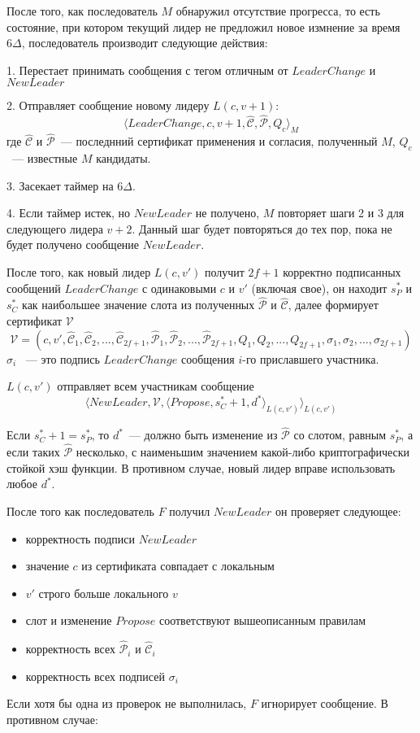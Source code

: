 После того, как последователь $M$ обнаружил отсутствие прогресса, то есть состояние, при котором текущий лидер не предложил новое измнение за время $6\Delta$, последователь производит следующие действия:

1. Перестает принимать сообщения с тегом отличным от $LeaderChange$ и $NewLeader$

2. Отправляет сообщение новому лидеру $L(c, v+1)$:
\[ \langle LeaderChange, c, v+1,  \hat{\mathcal{C}}, \hat{\mathcal{P}}, Q_c \rangle_M \]
где $\hat{\mathcal{C}}$ и $\hat{\mathcal{P}}$~--- последнний сертификат применения и согласия, полученный $M$, $Q_c$~--- известные $M$ кандидаты.

3. Засекает таймер на $6\Delta$.

4. Если таймер истек, но $NewLeader$ не получено, $M$ повторяет шаги 2 и 3 для следующего лидера $v+2$. Данный шаг будет повторяться до тех пор, пока не будет получено сообщение $NewLeader$.
\vspace{10pt}

После того, как новый лидер $L(c, v')$ получит $2f+1$ корректно подписанных сообщений $LeaderChange$ с одинаковыми $c$ и $v'$  (включая свое), он находит $s_P^{*}$ и $s_C^{*}$ как наибольшее значение слота из полученных $\hat{\mathcal{P}}$ и $\hat{\mathcal{C}}$, далее формирует сертификат $\mathcal{V}$
$$\mathcal{V}=(c, v', \hat{\mathcal{C}}_1,\hat{\mathcal{C}}_2,...,\hat{\mathcal{C}}_{2f+1}, \hat{\mathcal{P}}_1,\hat{\mathcal{P}}_2,...,\hat{\mathcal{P}}_{2f+1}, Q_1, Q_2,..., Q_{2f+1}, \sigma_1, \sigma_2,..., \sigma_{2f+1})$$ 
$\sigma_i$ ~--- это подпись $LeaderChange$ сообщения $i$-го приславшего участника.

$L(c, v')$ отправляет всем участникам сообщение
\[ \langle NewLeader, \mathcal{V}, \langle Propose, s_C^{*}+1, d^{*} \rangle_{L(c, v')} \rangle_{L(c, v')} \]

Если $s_C^{*}+1 = s_P^{*}$, то $d^{*}$~--- должно быть изменение из $\hat{\mathcal{P}}$ со слотом, равным $s_P^{*}$, а если таких $\hat{\mathcal{P}}$ несколько, с наименьшим значением какой-либо криптографически   стойкой хэш функции. В противном случае, новый лидер вправе использовать любое $d^{*}$.
\vspace{10pt}

После того как последователь $F$ получил $NewLeader$ он проверяет следующее:
\begin{itemize}
\item корректность подписи $NewLeader$
\item значение $c$ из сертификата совпадает с локальным
\item $v'$ строго больше локального $v$
\item слот и изменение $Propose$ соответствуют вышеописанным правилам
\item корректность всех $\hat{\mathcal{P}}_i$ и $\hat{\mathcal{C}}_i$
\item корректность всех подписей $\sigma_i$
\end{itemize}
Если хотя бы одна из проверок не выполнилась, $F$ игнорирует сообщение. В противном случае:

